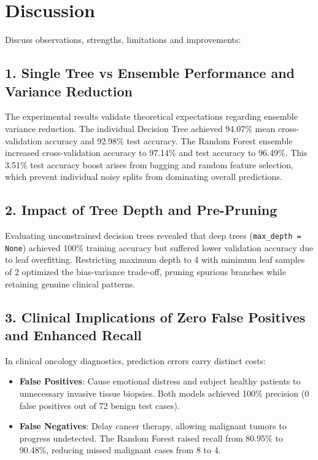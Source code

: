 \documentclass[12pt,a4paper]{article}
\begin{document}
\section{Discussion}
Discuss observations, strengths, limitations and improvements:

\subsection*{1. Single Tree vs Ensemble Performance and Variance Reduction}
The experimental results validate theoretical expectations regarding ensemble variance reduction. The individual Decision Tree achieved 94.07\% mean cross-validation accuracy and 92.98\% test accuracy. The Random Forest ensemble increased cross-validation accuracy to 97.14\% and test accuracy to 96.49\%. This 3.51\% test accuracy boost arises from bagging and random feature selection, which prevent individual noisy splits from dominating overall predictions.

\subsection*{2. Impact of Tree Depth and Pre-Pruning}
Evaluating unconstrained decision trees revealed that deep trees (\texttt{max\_depth = None}) achieved 100\% training accuracy but suffered lower validation accuracy due to leaf overfitting. Restricting maximum depth to 4 with minimum leaf samples of 2 optimized the bias-variance trade-off, pruning spurious branches while retaining genuine clinical patterns.

\subsection*{3. Clinical Implications of Zero False Positives and Enhanced Recall}
In clinical oncology diagnostics, prediction errors carry distinct costs:
\begin{itemize}
\item \textbf{False Positives}: Cause emotional distress and subject healthy patients to unnecessary invasive tissue biopsies. Both models achieved 100\% precision (0 false positives out of 72 benign test cases).
\item \textbf{False Negatives}: Delay cancer therapy, allowing malignant tumors to progress undetected. The Random Forest raised recall from 80.95\% to 90.48\%, reducing missed malignant cases from 8 to 4.
\end{itemize}
\end{document}
